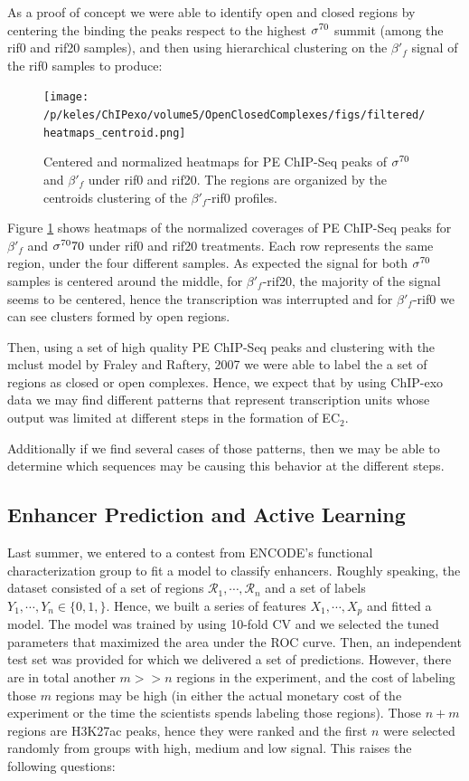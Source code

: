 \documentclass[11pt]{article}\usepackage[]{graphicx}\usepackage[]{color}
\begin{document}
As a proof of concept we were able to identify open and closed regions
by centering the binding the peaks respect to the highest $\sigma^{70}$
summit (among the rif0 and rif20 samples), and then using hierarchical
clustering on the $\beta'_f$ signal of the rif0 samples to produce:

\begin{figure}[H]
  \centering
 \texttt{[image: /p/keles/ChIPexo/volume5/OpenClosedComplexes/figs/filtered/heatmaps\_centroid.png]}
 \caption{Centered and normalized heatmaps for PE ChIP-Seq peaks of
   $\sigma^{70}$ and $\beta'_f$ under rif0 and rif20. The regions are
   organized by the centroids clustering of the $\beta'_f$-rif0
   profiles.}
  \label{fig:hm1}
\end{figure}

Figure \ref{fig:hm1} shows heatmaps of the normalized coverages of PE
ChIP-Seq peaks for $\beta'_f$ and $\sigma^{70}70$ under rif0 and rif20
treatments. Each row represents the same region, under the four
different samples. As expected the signal for both $\sigma^{70}$ samples is
centered around the middle, for $\beta'_f$-rif20, the majority of the
signal seems to be centered, hence the transcription was interrupted
and for $\beta'_f$-rif0 we can see clusters formed by open regions.

Then, using a set of high quality PE ChIP-Seq peaks and clustering
with the mclust model by Fraley and Raftery, 2007 \cite{mclust} we
were able to label the a set of regions as closed or open
complexes. Hence, we expect that by using ChIP-exo data we may find
different patterns that represent transcription units whose output was
limited at different steps in the formation of EC$_2$.

Additionally if we find several cases of those patterns, then we may
be able to determine which sequences may be causing this behavior at
the different steps.

\subsection{Enhancer Prediction and Active Learning}
\label{sec:enhancer}

Last summer, we entered to a contest from ENCODE's functional
characterization group to fit a model to classify enhancers. Roughly
speaking, the dataset consisted of a set of regions
$\mathcal{R}_1,\cdots,\mathcal{R}_n$ and a set of labels
$Y_1,\cdots,Y_n \in \{0,1,\}$. Hence, we built a series of features
$X_1,\cdots,X_p$ and fitted a model. The model was trained by using
10-fold CV and we selected the tuned parameters that maximized the
area under the ROC curve. Then, an independent test set was provided
for which we delivered a set of predictions. However, there are in
total another $m >> n$ regions in the experiment, and the cost of
labeling those $m$ regions may be high (in either the actual monetary
cost of the experiment or the time the scientists spends labeling
those regions). Those $n+m$ regions are H3K27ac peaks, hence they were
ranked and the first $n$ were selected randomly from groups with high,
medium and low signal. This raises the following questions:
\end{document}
